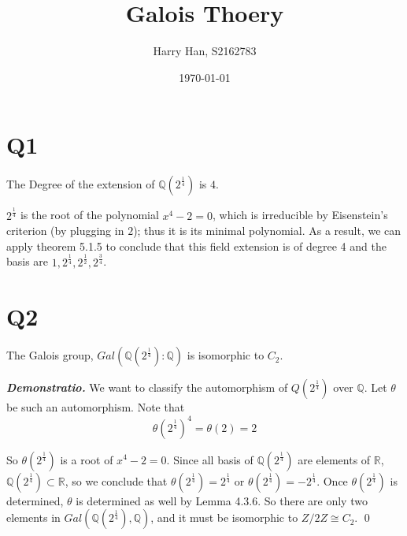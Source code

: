 \documentclass{article}
\title{Galois Thoery}
\author{Harry Han, S2162783}
\date{\today}
\theoremstyle{definition}
\theoremstyle{definition}
\theoremstyle{remark}
\renewenvironment{proof}{\vspace{0.4cm}\noindent\small{\emph{Demonstratio.}}}{\qed\vspace{0.4cm}}
\renewcommand{\emph}[1]{\textbf{\textit{#1}}}
\newcommand{\bb}[1]{\mathbb{#1}} %
\begin{document}
\maketitle
\section*{Q1}

The Degree of the extension of $\bb{Q}(2^{\frac{1}{4}})$ is $4$. 

$2^{\frac{1}{4}}$ is the root of the polynomial $x^4 - 2 = 0$, which is irreducible by Eisenstein's criterion (by plugging in $2$); thus it is its minimal polynomial.
As a result, we can apply theorem 5.1.5 to conclude that this field extension is of degree 4 and the basis are $1, 2^{\frac{1}{4}}, 2^{\frac{1}{2}}, 2^{\frac{3}{4}}$.

\section*{Q2}
The Galois group, $Gal(\bb{Q}(2^{\frac{1}{4}}): \bb{Q})$ is isomorphic to $C_2$.

\begin{proof}
	We want to classify the automorphism of $Q(2^{\frac{1}{4}})$ over $\bb{Q}$.
	Let $\theta$ be such an automorphism. 
	Note that 
	$$
	\theta(2^{\frac{1}{4}})^4 = \theta(2) = 2
	$$

	So $\theta(2^{\frac{1}{4}})$ is a root of $x^4 - 2 = 0$.
	Since all basis of $\bb{Q}(2^{\frac{1}{4}})$ are elements of $\bb{R}$, $\bb{Q}(2^{\frac{1}{4}}) \subset \bb{R}$, so we conclude that $\theta(2^{\frac{1}{4}}) = 2^{\frac{1}{4}}$  or $\theta(2^{\frac{1}{4}}) = -2^{\frac{1}{4}}$.
	Once $\theta(2^{\frac{1}{4}})$ is determined, $\theta$ is determined as well by Lemma 4.3.6.
	So there are only two elements in $Gal(\bb{Q}(2^{\frac{1}{4}}), \bb{Q})$, and it must be isomorphic to $Z / 2Z \cong C_2 $.
\end{proof}
\end{document}
